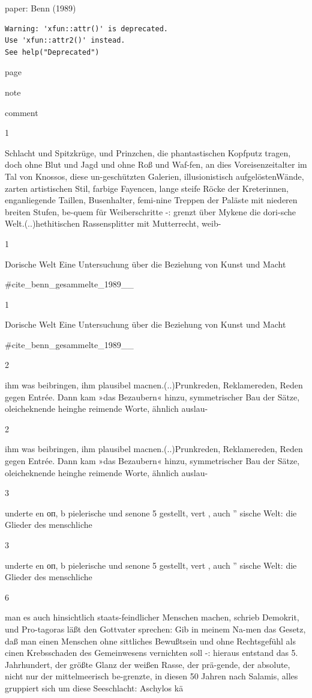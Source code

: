 \documentclass[
  letterpaper,
  DIV=11,
  numbers=noendperiod]{scrartcl}
\newcounter{none} %
\begin{document}
paper: Benn (1989)

\begin{verbatim}
Warning: 'xfun::attr()' is deprecated.
Use 'xfun::attr2()' instead.
See help("Deprecated")
\end{verbatim}

page

note

comment

1

Schlacht und Spitzkrüge, und Prinzchen, die phantastischen Kopfputz
tragen, doch ohne Blut und Jagd und ohne Roß und Waf-fen, an dies
Voreisenzeitalter im Tal von Knossos, diese un-geschützten Galerien,
illusionistisch aufgelöstenWände, zarten artistischen Stil, farbige
Fayencen, lange steife Röcke der Kreterinnen, enganliegende Taillen,
Busenhalter, femi-nine Treppen der Paläste mit niederen breiten Stufen,
be-quem für Weiberschritte -: grenzt über Mykene die dori-sche
Welt.(..)hethitischen Rassensplitter mit Mutterrecht, weib-

1

Dorische Welt Eine Untersuchung über die Beziehung von Kunst und Macht

\#cite\_benn\_gesammelte\_1989\_\_

1

Dorische Welt Eine Untersuchung über die Beziehung von Kunst und Macht

\#cite\_benn\_gesammelte\_1989\_\_

2

ihm was beibringen, ihm plausibel macnen.(..)Prunkreden, Reklamereden,
Reden gegen Entrée. Dann kam »das Bezaubern« hinzu, symmetrischer Bau
der Sätze, oleicheknende heinghe reimende Worte, ähnlich auslau-

2

ihm was beibringen, ihm plausibel macnen.(..)Prunkreden, Reklamereden,
Reden gegen Entrée. Dann kam »das Bezaubern« hinzu, symmetrischer Bau
der Sätze, oleicheknende heinghe reimende Worte, ähnlich auslau-

3

underte en оп, b pielerische und senone 5 gestellt, vert , auch ''
sische Welt: die Glieder des menschliche

3

underte en оп, b pielerische und senone 5 gestellt, vert , auch ''
sische Welt: die Glieder des menschliche

6

man es auch hinsichtlich staats-feindlicher Menschen machen, schrieb
Demokrit, und Pro-tagoras läßt den Gottvater sprechen: Gib in meinem
Na-men das Gesetz, daß man einen Menschen ohne sittliches Bewußtsein und
ohne Rechtsgefühl als cinen Krebsschaden des Gemeinwesens vernichten
soll -: hieraus entstand das 5. Jahrhundert, der größte Glanz der weißen
Rasse, der prä-gende, der absolute, nicht nur der mittelmeerisch
be-grenzte, in diesen 50 Jahren nach Salamis, alles gruppiert sich um
diese Seeschlacht: Aschylos kä
\end{document}
